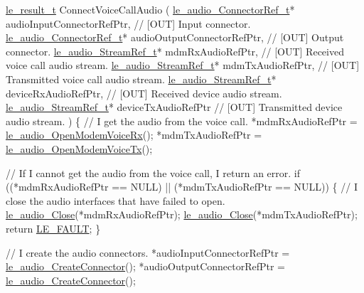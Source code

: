 \begin{DoxyCode}
\hyperlink{le__basics_8h_a1cca095ed6ebab24b57a636382a6c86c}{le\_result\_t} ConnectVoiceCallAudio
(
    \hyperlink{le__audio__interface_8h_ab819480f4ce3f36e62b6a4e327668304}{le\_audio\_ConnectorRef\_t}*  audioInputConnectorRefPtr,  \textcolor{comment}{// [OUT] Input connector.}
    \hyperlink{le__audio__interface_8h_ab819480f4ce3f36e62b6a4e327668304}{le\_audio\_ConnectorRef\_t}*  audioOutputConnectorRefPtr, \textcolor{comment}{// [OUT] Output connector.}
    \hyperlink{le__audio__interface_8h_a9a46ff5a5afa61f1bc76120ab9e4da0a}{le\_audio\_StreamRef\_t}*     mdmRxAudioRefPtr,           \textcolor{comment}{// [OUT] Received voice call
       audio stream.}
    \hyperlink{le__audio__interface_8h_a9a46ff5a5afa61f1bc76120ab9e4da0a}{le\_audio\_StreamRef\_t}*     mdmTxAudioRefPtr,           \textcolor{comment}{// [OUT] Transmitted voice
       call audio stream.}
    \hyperlink{le__audio__interface_8h_a9a46ff5a5afa61f1bc76120ab9e4da0a}{le\_audio\_StreamRef\_t}*     deviceRxAudioRefPtr,        \textcolor{comment}{// [OUT] Received device
       audio stream.}
    \hyperlink{le__audio__interface_8h_a9a46ff5a5afa61f1bc76120ab9e4da0a}{le\_audio\_StreamRef\_t}*     deviceTxAudioRefPtr         \textcolor{comment}{// [OUT] Transmitted device
       audio stream.}
)
\{
    \textcolor{comment}{// I get the audio from the voice call.}
    *mdmRxAudioRefPtr = \hyperlink{le__audio__interface_8h_ae3ed568ba4d2763ea77e17e77b20ff02}{le\_audio\_OpenModemVoiceRx}();
    *mdmTxAudioRefPtr = \hyperlink{le__audio__interface_8h_ad745f008bb04873c817da7af3daf783d}{le\_audio\_OpenModemVoiceTx}();

    \textcolor{comment}{// If I cannot get the audio from the voice call, I return an error.}
    \textcolor{keywordflow}{if} ((*mdmRxAudioRefPtr == NULL) || (*mdmTxAudioRefPtr == NULL))
    \{
            \textcolor{comment}{// I close the audio interfaces that have failed to open.}
            \hyperlink{le__audio__interface_8h_abafeb411da7b1a14b2d5777fc1d3e394}{le\_audio\_Close}(*mdmRxAudioRefPtr);
            \hyperlink{le__audio__interface_8h_abafeb411da7b1a14b2d5777fc1d3e394}{le\_audio\_Close}(*mdmTxAudioRefPtr);
            \textcolor{keywordflow}{return} \hyperlink{le__basics_8h_a1cca095ed6ebab24b57a636382a6c86cac409634423b6b1ef09643529f6224798}{LE\_FAULT};
    \}

    \textcolor{comment}{// I create the audio connectors.}
    *audioInputConnectorRefPtr = \hyperlink{le__audio__interface_8h_a570aaf85086f00aca592acfbaaa237be}{le\_audio\_CreateConnector}();
    *audioOutputConnectorRefPtr = \hyperlink{le__audio__interface_8h_a570aaf85086f00aca592acfbaaa237be}{le\_audio\_CreateConnector}();


\end{DoxyCode}
